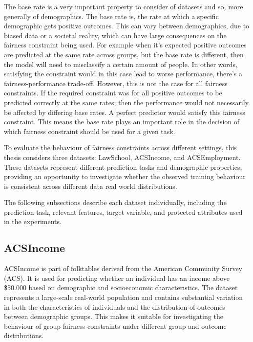 The base rate is a very important property to consider of datasets and so, more generally of demographics. The base rate is, the rate at which a specific demographic gets positive outcomes. This can vary between demographics, due to biased data or a societal reality, which can have large consequences on the fairness constraint being used. For example when it's expected positive outcomes are predicted at the same rate across groups, but the base rate is different, then the model will need to misclassify a certain amount of people. In other words, satisfying the constraint would in this case lead to worse performance, there's a fairness-performance trade-off. However, this is not the case for all fairness constraints. If the required constraint was for all positive outcomes to be predicted correctly at the same rates, then the performance would not necessarily be affected by differing base rates. A perfect predictor would satisfy this fairness constraint. This means the base rate plays an important role in the decision of which fairness constraint should be used for a given task.


To evaluate the behaviour of fairness constraints across different settings, this thesis considers three datasets: LawSchool, ACSIncome, and ACSEmployment. These datasets represent different prediction tasks and demographic properties, providing an opportunity to investigate whether the observed training behaviour is consistent across different data real world distributions.

The following subsections describe each dataset individually, including the prediction task, relevant features, target variable, and protected attributes used in the experiments.


\subsection{ACSIncome}
ACSIncome is part of folktables \cite{folktables} derived from the American Community Survey (ACS). It is used for predicting whether an individual has an income above \$50.000 based on demographic and socioeconomic characteristics. The dataset represents a large-scale real-world population and contains substantial variation in both the characteristics of individuals and the distribution of outcomes between demographic groups. This makes it suitable for investigating the behaviour of group fairness constraints under different group and outcome distributions.

